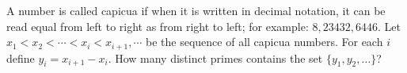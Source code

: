 A number is called capicua if when it is written in decimal notation, it can be read equal from left to right as from right to left; for example: $8, 23432, 6446$. Let $x_1<x_2<\cdots<x_i<x_{i+1},\cdots$ be the sequence of all capicua numbers. For each $i$ define $y_i=x_{i+1}-x_i$. How many distinct primes contains the set $\{y_1,y_2, \ldots\}$?